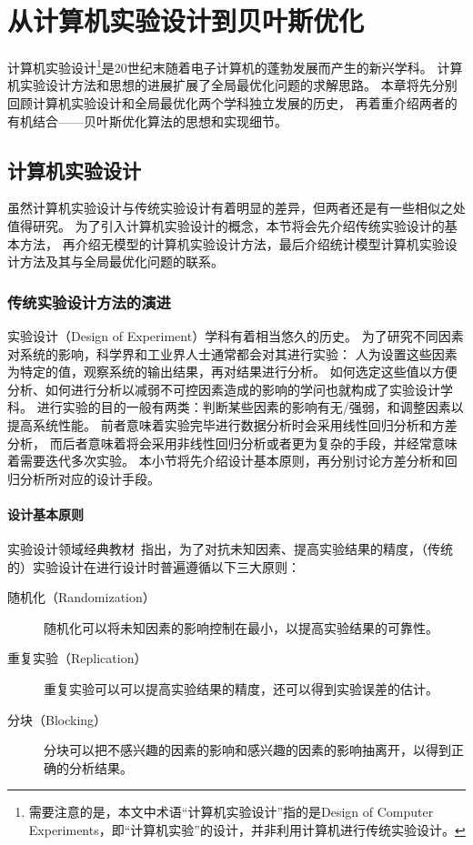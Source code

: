 \documentclass[index]{subfiles}
\begin{document}
\chapter{从计算机实验设计到贝叶斯优化}
计算机实验设计\footnote{需要注意的是，本文中术语“计算机实验设计”指的是Design of Computer Experiments，即“计算机实验”的设计，并非利用计算机进行传统实验设计。}是20世纪末随着电子计算机的蓬勃发展而产生的新兴学科\cite{mckay1979}。
计算机实验设计方法和思想的进展扩展了全局最优化问题的求解思路。
本章将先分别回顾计算机实验设计和全局最优化两个学科独立发展的历史，
再着重介绍两者的有机结合——贝叶斯优化算法的思想和实现细节。

\section{计算机实验设计}
虽然计算机实验设计与传统实验设计有着明显的差异，但两者还是有一些相似之处值得研究。
为了引入计算机实验设计的概念，本节将会先介绍传统实验设计的基本方法，
再介绍无模型的计算机实验设计方法，最后介绍统计模型计算机实验设计方法及其与全局最优化问题的联系。

\subsection{传统实验设计方法的演进}
实验设计（Design of Experiment）学科有着相当悠久的历史。
为了研究不同因素对系统的影响，科学界和工业界人士通常都会对其进行实验：
人为设置这些因素为特定的值，观察系统的输出结果，再对结果进行分析。
如何选定这些值以方便分析、如何进行分析以减弱不可控因素造成的影响的学问也就构成了实验设计学科\cite{davies1954}。
进行实验的目的一般有两类：判断某些因素的影响有无/强弱，和调整因素以提高系统性能。
前者意味着实验完毕进行数据分析时会采用线性回归分析和方差分析，
而后者意味着将会采用非线性回归分析或者更为复杂的手段，并经常意味着需要迭代多次实验。
本小节将先介绍设计基本原则，再分别讨论方差分析和回归分析所对应的设计手段。

\subsubsection{设计基本原则}
实验设计领域经典教材~\cite{montgomery}指出，为了对抗未知因素、提高实验结果的精度，（传统的）实验设计在进行设计时普遍遵循以下三大原则：
\begin{description}
  \item[随机化（Randomization）] 随机化可以将未知因素的影响控制在最小，以提高实验结果的可靠性。
  \item[重复实验（Replication）] 重复实验可以可以提高实验结果的精度，还可以得到实验误差的估计。
  \item[分块（Blocking）] 分块可以把不感兴趣的因素的影响和感兴趣的因素的影响抽离开，以得到正确的分析结果。
\end{description}
\end{document}
